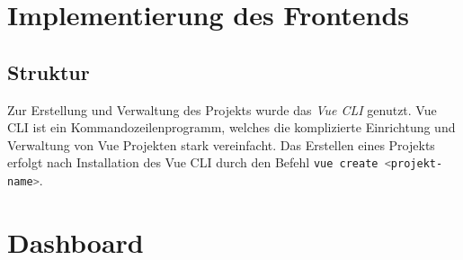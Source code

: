 






\section{Implementierung des Frontends}

\subsection{Struktur}

Zur Erstellung und Verwaltung des Projekts wurde das \textit{Vue CLI} genutzt.
Vue CLI ist ein Kommandozeilenprogramm, welches die komplizierte Einrichtung und
Verwaltung von Vue Projekten stark vereinfacht. Das Erstellen eines Projekts
erfolgt nach Installation des Vue CLI durch den Befehl \lstinline[style=code,
    language=bash, style=inline]{vue create <projekt-name>}.














\section{Dashboard}